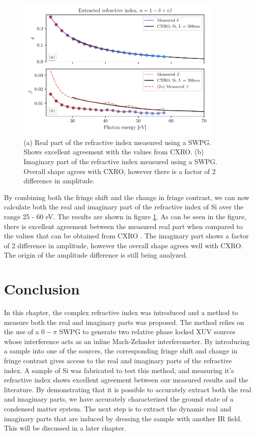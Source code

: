 \begin{figure}
	\centering
	\includegraphics[width=0.9\textwidth]{figures/refractive_index/db_cxro.pdf}
	\caption{(a) Real part of the refractive index measured using a SWPG.  Shows excellent agreement with the values from CXRO. (b) Imaginary part of the refractive index measured using a SWPG.  Overall shape agrees with CXRO, however there is a factor of 2 difference in amplitude.}
	\label{fig:measured_delta_beta}
\end{figure}
By combining both the fringe shift and the change in fringe contrast, we can now calculate both the real and imaginary part of the refractive index of Si over the range 25 - 60 eV.  The results are shown in figure \ref{fig:measured_delta_beta}.  As can be seen in the figure, there is excellent agreement between the measured real part when compared to the values that can be obtained from CXRO \cite{henkeXRayInteractionsPhotoabsorption1993}.  The imaginary part shows a factor of 2 difference in amplitude, however the overall shape agrees well with CXRO. The origin of the amplitude difference is still being analyzed.

\section{Conclusion}
In this chapter, the complex refractive index was introduced and a method to measure both the real and imaginary parts was proposed. The method relies on the use of a $0-\pi$ SWPG to generate two relative phase locked XUV sources whose interference acts as an inline Mach-Zehnder interferometer.  By introducing a sample into one of the sources, the corresponding fringe shift and change in fringe contrast gives access to the real and imaginary parts of the refractive index.  A sample of Si was fabricated to test this method, and measuring it's refractive index shows excellent agreement between our measured results and the literature. By demonstrating that it is possible to accurately extract both the real and imaginary parts, we have accurately characterized the ground state of a condensed matter system.  The next step is to extract the dynamic real and imaginary parts that are induced by dressing the sample with another IR field.  This will be discussed in a later chapter.



